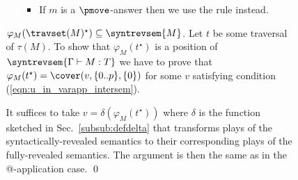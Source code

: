 \begin{itemize}[$\bullet$]
\begin{description}
\begin{enumerate}[1.]
\begin{itemize}
\begin{itemize}
               \item  If $m$ is a $\pmove$-answer then we use the rule  instead.
               \end{itemize}
               \end{itemize}

\item[$\varphi_{M}( \travset(M)^\star) \subseteq \syntrevsem{M}$.]
  Let $t$ be some traversal of $\tau(M)$. To show that
  $\varphi_{M}(t^\star)$ is a position of $\syntrevsem{\Gamma \vdash M : T}$ we have to prove that $\varphi_{M}(t^\star) = \cover(v, \{0..p\}, \{0\})$ for some $v$ satisfying condition (\ref{eqn:u_in_varapp_intersem}).

  It suffices to take $v = \delta(\varphi_{M}(t^\star))$
  where $\delta$ is the function sketched in Sec.\ \ref{subsub:defdelta} that transforms plays of the syntactically-revealed semantics to their corresponding plays of the fully-revealed semantics. The argument is then the same as in the @-application case. \qed

        \end{enumerate}

    \end{description}

\end{itemize}


